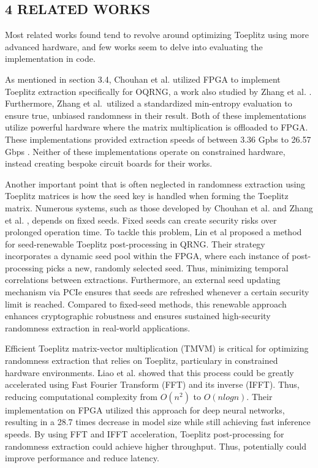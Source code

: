 \subsection{\texorpdfstring{4 RELATED WORKS }{4 RELATED WORKS }}\label{related-works}

Most related works found tend to revolve around optimizing Toeplitz using more advanced hardware, and few works seem to delve into evaluating the implementation in code.

As mentioned in section 3.4, Chouhan et al. \cite{toeplitz-desc} utilized FPGA to implement Toeplitz extraction specifically for OQRNG, a work also studied by Zhang et al. \cite{toeplitz}. Furthermore, Zhang et al.~utilized a standardized min-entropy evaluation to ensure true, unbiased randomness in their result. Both of these implementations utilize powerful hardware where the matrix multiplication is offloaded to FPGA. These implementations provided extraction speeds of between 3.36 Gpbs \cite{toeplitz} to 26.57 Gbps \cite{toeplitz-desc}. Neither of these implementations operate on constrained hardware, instead creating bespoke circuit boards for their works.

Another important point that is often neglected in randomness extraction using Toeplitz matrices is how the seed key is handled when forming the Toeplitz matrix. Numerous systems, such as those developed by Chouhan et al. \cite{toeplitz-desc} and Zhang et al. \cite{toeplitz}, depends on fixed seeds. Fixed seeds can create security risks over prolonged operation time. To tackle this problem, Lin et al \cite{lin} proposed a method for seed-renewable Toeplitz post-processing in QRNG. Their strategy incorporates a dynamic seed pool within the FPGA, where each instance of post-processing picks a new, randomly selected seed. Thus, minimizing temporal correlations between extractions. Furthermore, an external seed updating mechanism via PCIe ensures that seeds are refreshed whenever a certain security limit is reached. Compared to fixed-seed methods, this renewable approach enhances cryptographic robustness and ensures sustained high-security randomness extraction in real-world applications.

Efficient Toeplitz matrix-vector multiplication (TMVM) is critical for optimizing randomness extraction that relies on Toeplitz, particulary in constrained hardware environments. Liao et al. \cite{liao} showed that this process could be greatly accelerated using Fast Fourier Transform (FFT) and its inverse (IFFT). Thus, reducing computational complexity from \(O(n^2)\) to \(O(n log n)\). Their implementation on FPGA utilized this approach for deep neural networks, resulting in a 28.7 times decrease in model size while still achieving fast inference speeds. By using FFT and IFFT acceleration, Toeplitz post-processing for randomness extraction could achieve higher throughput. Thus, potentially could improve performance and reduce latency.

